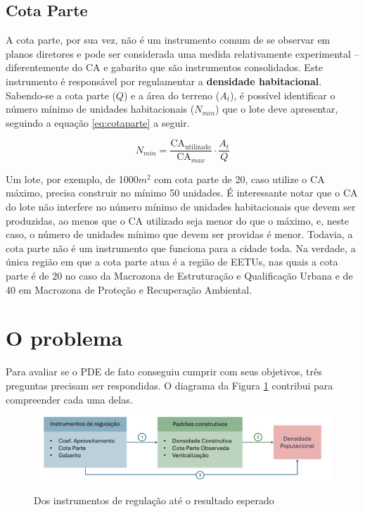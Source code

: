 \subsection*{Cota Parte}

A cota parte, por sua vez, não é um instrumento comum de se observar em planos diretores e pode ser considerada uma medida relativamente experimental -- diferentemente do CA e gabarito que são instrumentos consolidados. Este instrumento é responsável por regulamentar a \textbf{densidade habitacional}. Sabendo-se a cota parte ($Q$) e a área do terreno ($A_t$), é possível identificar o número mínimo de unidades habitacionais ($N_{min}$) que o lote deve apresentar, seguindo a equação \ref{eq:cotaparte} a seguir. 

\begin{equation}
    N_{min} = \frac{\text{CA}_{\text{utilizado}}}{\text{CA}_{max}}\cdot \frac{A_t}{Q}
    \label{eq:cotaparte}
\end{equation}

Um lote, por exemplo, de 1000$m^2$ com cota parte de 20, caso utilize o CA máximo, precisa construir no mínimo 50 unidades. É interessante notar que o CA do lote não interfere no número mínimo de unidades habitacionais que devem ser produzidas, ao menos que o CA utilizado seja menor do que o máximo, e, neste caso, o número de unidades mínimo que devem ser providas é menor. Todavia, a cota parte não é um instrumento que funciona para a cidade toda. Na verdade, a única região em que a cota parte atua é a região de EETUs, nas quais a cota parte é de 20 no caso da Macrozona de Estruturação e Qualificação Urbana e de 40 em Macrozona de Proteção e Recuperação Ambiental.

\section{O problema}

Para avaliar se o PDE de fato conseguiu cumprir com seus objetivos, três preguntas precisam ser respondidas. O diagrama da Figura \ref{fig:diagrama} contribui para compreender cada uma delas.

\begin{figure}[h]
    \caption{Dos instrumentos de regulação até o resultado esperado}
    \includegraphics[width = \linewidth]{figuras/desenho_proposta.pdf}
    \label{fig:diagrama}
\end{figure}


